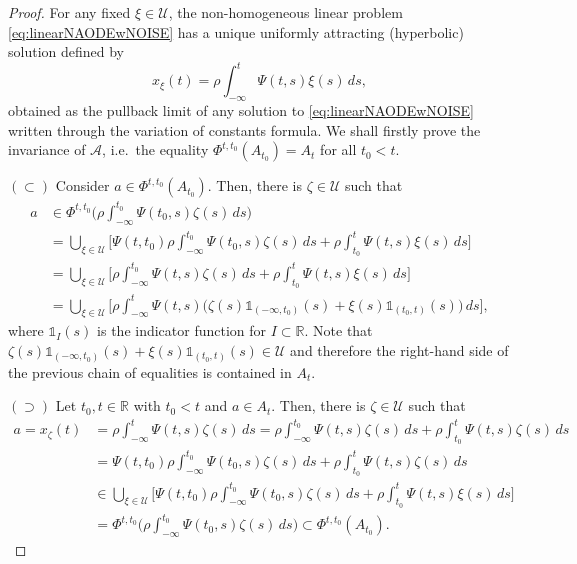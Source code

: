 \documentclass[reqno]{amsart}
\theoremstyle{definition}
\numberwithin{equation}{section}
\newcommand{\R}{\mathbb{R}}
\newcommand{\A}{\mathcal{A}}
\newcommand{\U}{\mathcal{U}}
\begin{document}
\begin{proof}
     For any fixed $\xi\in\U$, the non-homogeneous linear problem \eqref{eq:linearNAODEwNOISE} has a unique uniformly attracting (hyperbolic) solution defined by 
    \[
    x_\xi(t)=\rho\int_{-\infty}^t\Psi(t,s)\xi(s)\,ds,
    \]
    obtained as the pullback limit of any solution to \eqref{eq:linearNAODEwNOISE} written through the variation of constants formula. We shall firstly prove the invariance of $\A$, i.e.~the equality $\Phi^{t,t_0}(A_{t_0})= A_t$ for all $t_0<t$.

    $(\subset)$ Consider $a\in\Phi^{t,t_0}(A_{t_0})$. Then, there is $\zeta\in\U$ such that 
    \[
    \begin{split}
    a&\in\Phi^{t,t_0}\bigg(\rho\int_{-\infty}^{t_0}\Psi(t_0,s)\zeta(s)\,ds\bigg)\\
    &=\bigcup_{\xi\in\U}\Big[\Psi(t,t_0)\rho\int_{-\infty}^{t_0}\Psi(t_0,s)\zeta(s)\,ds+\rho\int_{t_0}^t\Psi(t,s)\xi(s)\,ds\Big]\\
    &=\bigcup_{\xi\in\U}\Big[\rho\int_{-\infty}^{t_0}\Psi(t,s)\zeta(s)\,ds+\rho\int_{t_0}^t\Psi(t,s)\xi(s)\,ds\Big]\\
    &=\bigcup_{\xi\in\U}\Big[\rho\int_{-\infty}^{t}\Psi(t,s)\big(\zeta(s)\mathds{1}_{(-\infty,t_0)}(s)+\xi(s)\mathds{1}_{(t_0,t)}(s)\big)\,ds\Big],
     \end{split}
    \]
    where $\mathds{1}_I(s)$ is the indicator function for $I\subset\R$. Note that $\zeta(s)\mathds{1}_{(-\infty,t_0)}(s)+\xi(s)\mathds{1}_{(t_0,t)}(s)\in\U$ and therefore the right-hand side of the previous chain of equalities is contained in $ A_t$.

    $(\supset)$ Let $t_0,t\in\R$ with $t_0<t$ and $a\in  A_t$. Then, there is $\zeta\in\U$ such that 
    \[
    \begin{split}
    a= x_\zeta(t)&=\rho\int_{-\infty}^{t}\Psi(t,s)\zeta(s)\,ds=\rho\int_{-\infty}^{t_0}\Psi(t,s)\zeta(s)\,ds+\rho\int_{t_0}^{t}\Psi(t,s)\zeta(s)\,ds\\
    &=\Psi(t,t_0)\rho\int_{-\infty}^{t_0}\Psi(t_0,s)\zeta(s)\,ds+\rho\int_{t_0}^t\Psi(t,s)\zeta(s)\,ds\\
    &\in \bigcup_{\xi\in\U}\Big[\Psi(t,t_0)\rho\int_{-\infty}^{t_0}\Psi(t_0,s)\zeta(s)\,ds+\rho\int_{t_0}^t\Psi(t,s)\xi(s)\,ds\Big]\\
    &=\Phi^{t,t_0}\bigg(\rho\int_{-\infty}^{t_0}\Psi(t_0,s)\zeta(s)\,ds\bigg)\subset\Phi^{t,t_0}(A_{t_0}).
    \end{split}
    \]


\end{proof}
\end{document}
